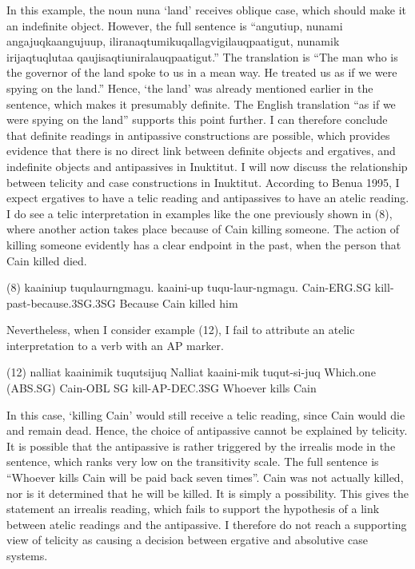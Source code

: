 \documentclass[12pt]{article}
\begin{document}
In this example, the noun nuna ‘land’ receives oblique case, which should make it an indefinite object. However, the full sentence is “angutiup, nunami angajuqkaangujuup, iliranaqtumikuqallagvigilauqpaatigut, nunamik irijaqtuqlutaa qaujisaqtiuniralauqpaatigut.” The translation is “The man who is the governor of the land spoke to us in a mean way. He treated us as if we were spying on the land.” Hence, ‘the land’ was already mentioned earlier in the sentence, which makes it presumably definite. The English translation “as if we were spying on the land” supports this point further. I can therefore conclude that definite readings in antipassive constructions are possible, which provides evidence that there is no direct link between definite objects and ergatives, and indefinite objects and antipassives in Inuktitut.
I will now discuss the relationship between telicity and case constructions in Inuktitut. According to Benua 1995, I expect ergatives to have a telic reading and antipassives to have an atelic reading. I do see a telic interpretation in examples like the one previously shown in (8), where another action takes place because of Cain killing someone. The action of killing someone evidently has a clear endpoint in the past, when the person that Cain killed died.

(8) kaainiup           tuqulaurngmagu.
      kaaini-up         tuqu-laur-ngmagu.
      Cain-ERG.SG kill-past-because.3SG.3SG 
                  Because Cain killed him

Nevertheless, when I consider example (12), I fail to attribute an atelic interpretation to a verb with an AP marker. 


(12) nalliat kaainimik tuqutsijuq
        Nalliat kaaini-mik tuqut-si-juq
        Which.one (ABS.SG) Cain-OBL SG kill-AP-DEC.3SG 
                    Whoever kills Cain 

In this case, ‘killing Cain’ would still receive a telic reading, since Cain would die and remain dead. Hence, the choice of antipassive cannot be explained by telicity. It is possible that the antipassive is rather triggered by the irrealis mode in the sentence, which ranks very low on the transitivity scale. The full sentence is “Whoever kills Cain will be paid back seven times”. Cain was not actually killed, nor is it determined that he will be killed. It is simply a possibility. This gives the statement an irrealis reading, which fails to support the hypothesis of a link between atelic readings and the antipassive. I therefore do not reach a supporting view of telicity as causing a decision between ergative and absolutive case systems.
\end{document}
